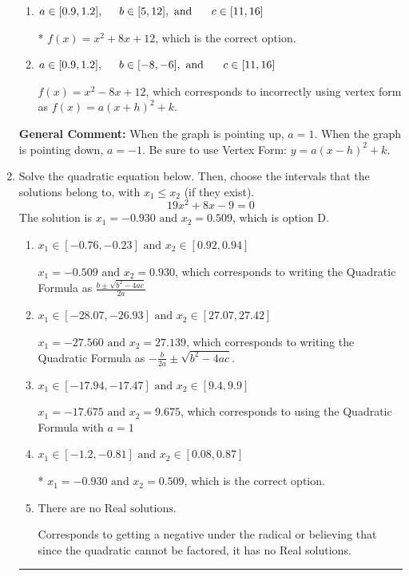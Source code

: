 \documentclass{extbook}[14pt]
\newcommand{\litem}[1]{\item #1

\rule{\textwidth}{0.4pt}}
\begin{document}
\begin{enumerate}
{\begin{enumerate}[label=\Alph*.]
$f(x)=x^{2} -8 x + 20$, which corresponds to incorrectly using vertex form as $f(x) = a(x+h)^2 - k$.
\item \( a \in [0.9, 1.2], \hspace*{5mm} b \in [5, 12], \text{ and } \hspace*{5mm} c \in [11, 16] \)

* $f(x)=x^{2} +8 x + 12$, which is the correct option.
\item \( a \in [0.9, 1.2], \hspace*{5mm} b \in [-8, -6], \text{ and } \hspace*{5mm} c \in [11, 16] \)

$f(x)=x^{2} -8 x + 12$, which corresponds to incorrectly using vertex form as $f(x) = a(x+h)^2+k$.
\end{enumerate}

\textbf{General Comment:} When the graph is pointing up, $a=1$. When the graph is pointing down, $a=-1$. Be sure to use Vertex Form: $y = a(x-h)^2+k$.
}
\litem{
Solve the quadratic equation below. Then, choose the intervals that the solutions belong to, with $x_1 \leq x_2$ (if they exist).
\[ 19x^{2} +8 x -9 = 0 \]The solution is \( x_1 = -0.930 \text{ and } x_2 = 0.509 \), which is option D.\begin{enumerate}[label=\Alph*.]
\item \( x_1 \in [-0.76, -0.23] \text{ and } x_2 \in [0.92, 0.94] \)

 $x_1 = -0.509 \text{ and } x_2 = 0.930$, which corresponds to writing the Quadratic Formula as $\frac{b \pm \sqrt{b^2 - 4ac}}{2a}$
\item \( x_1 \in [-28.07, -26.93] \text{ and } x_2 \in [27.07, 27.42] \)

 $x_1 = -27.560 \text{ and } x_2 = 27.139$, which corresponds to writing the Quadratic Formula as $-\frac{b}{2a} \pm \sqrt{b^2 - 4ac}$.
\item \( x_1 \in [-17.94, -17.47] \text{ and } x_2 \in [9.4, 9.9] \)

 $x_1 = -17.675 \text{ and } x_2 = 9.675$, which corresponds to using the Quadratic Formula with $a=1$
\item \( x_1 \in [-1.2, -0.81] \text{ and } x_2 \in [0.08, 0.87] \)

* $x_1 = -0.930 \text{ and } x_2 = 0.509$, which is the correct option.
\item \( \text{There are no Real solutions.} \)

Corresponds to getting a negative under the radical or believing that since the quadratic cannot be factored, it has no Real solutions.
\end{enumerate}

}
\end{enumerate}
\end{document}
